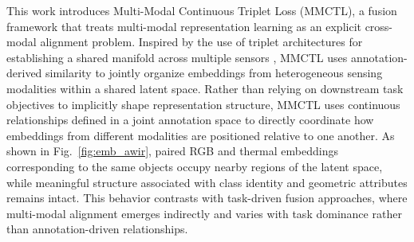 \documentclass[lettersize,journal]{IEEEtran}
\begin{document}
This work introduces Multi-Modal Continuous Triplet Loss (MMCTL), a fusion framework that treats multi-modal representation learning as an explicit cross-modal alignment problem. Inspired by the use of triplet architectures for establishing a shared manifold across multiple sensors \cite{dutt2022shared}, MMCTL uses annotation-derived similarity to jointly organize embeddings from heterogeneous sensing modalities within a shared latent space. Rather than relying on downstream task objectives to implicitly shape representation structure, MMCTL uses continuous relationships defined in a joint annotation space to directly coordinate how embeddings from different modalities are positioned relative to one another. As shown in Fig.~\ref{fig:emb_awir}, paired RGB and thermal embeddings corresponding to the same objects occupy nearby regions of the latent space, while meaningful structure associated with class identity and geometric attributes remains intact. This behavior contrasts with task-driven fusion approaches, where multi-modal alignment emerges indirectly and varies with task dominance rather than annotation-driven relationships.


\end{document}

